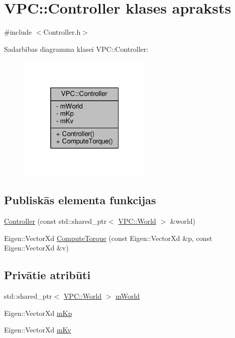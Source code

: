 \hypertarget{class_v_p_c_1_1_controller}{}\section{V\+PC\+:\+:Controller klases apraksts}
\label{class_v_p_c_1_1_controller}


{\ttfamily \#include $<$Controller.\+h$>$}



Sadarbības diagramma klasei V\+PC\+:\+:Controller\+:
\nopagebreak
\begin{figure}[H]
\begin{center}
\leavevmode
\includegraphics[width=181pt]{class_v_p_c_1_1_controller__coll__graph}
\end{center}
\end{figure}
\subsection*{Publiskās elementa funkcijas}
\begin{DoxyCompactItemize}
\item 
\hyperlink{class_v_p_c_1_1_controller_a132b5d8ac47550346fecf84fe8008179}{Controller} (const std\+::shared\+\_\+ptr$<$ \hyperlink{class_v_p_c_1_1_world}{V\+P\+C\+::\+World} $>$ \&world)
\item 
Eigen\+::\+Vector\+Xd \hyperlink{class_v_p_c_1_1_controller_a15c395dff986eed594d3f99d58e7d3d1}{Compute\+Torque} (const Eigen\+::\+Vector\+Xd \&p, const Eigen\+::\+Vector\+Xd \&v)
\end{DoxyCompactItemize}
\subsection*{Privātie atribūti}
\begin{DoxyCompactItemize}
\item 
std\+::shared\+\_\+ptr$<$ \hyperlink{class_v_p_c_1_1_world}{V\+P\+C\+::\+World} $>$ \hyperlink{class_v_p_c_1_1_controller_a9c46fee9b19ef4f4d79726717f923586}{m\+World}
\item 
Eigen\+::\+Vector\+Xd \hyperlink{class_v_p_c_1_1_controller_a88da6e3301abaeb5b63fd1519fb67cb1}{m\+Kp}
\item 
Eigen\+::\+Vector\+Xd \hyperlink{class_v_p_c_1_1_controller_a6c4a4f388d7ee81f2519e4b05f653f9d}{m\+Kv}
\end{DoxyCompactItemize}


